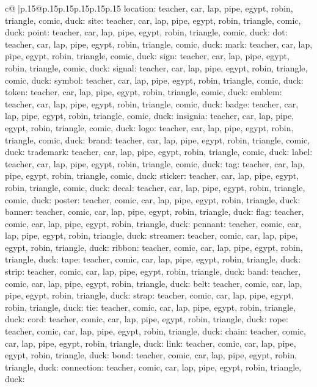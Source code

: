\documentclass{article}
\begin{document}
{\begin{supertabular}{c@{$\;$}|p{.15\linewidth}@{}p{.15\linewidth}p{.15\linewidth}p{.15\linewidth}p{.15\linewidth}p{.15\linewidth}}
{{{location\nTARGETS: teacher, car, lap, pipe, egypt, robin, triangle, comic, duck\n\nCLUE: site\nTARGETS: teacher, car, lap, pipe, egypt, robin, triangle, comic, duck\n\nCLUE: point\nTARGETS: teacher, car, lap, pipe, egypt, robin, triangle, comic, duck\n\nCLUE: dot\nTARGETS: teacher, car, lap, pipe, egypt, robin, triangle, comic, duck\n\nCLUE: mark\nTARGETS: teacher, car, lap, pipe, egypt, robin, triangle, comic, duck\n\nCLUE: sign\nTARGETS: teacher, car, lap, pipe, egypt, robin, triangle, comic, duck\n\nCLUE: signal\nTARGETS: teacher, car, lap, pipe, egypt, robin, triangle, comic, duck\n\nCLUE: symbol\nTARGETS: teacher, car, lap, pipe, egypt, robin, triangle, comic, duck\n\nCLUE: token\nTARGETS: teacher, car, lap, pipe, egypt, robin, triangle, comic, duck\n\nCLUE: emblem\nTARGETS: teacher, car, lap, pipe, egypt, robin, triangle, comic, duck\n\nCLUE: badge\nTARGETS: teacher, car, lap, pipe, egypt, robin, triangle, comic, duck\n\nCLUE: insignia\nTARGETS: teacher, car, lap, pipe, egypt, robin, triangle, comic, duck\n\nCLUE: logo\nTARGETS: teacher, car, lap, pipe, egypt, robin, triangle, comic, duck\n\nCLUE: brand\nTARGETS: teacher, car, lap, pipe, egypt, robin, triangle, comic, duck\n\nCLUE: trademark\nTARGETS: teacher, car, lap, pipe, egypt, robin, triangle, comic, duck\n\nCLUE: label\nTARGETS: teacher, car, lap, pipe, egypt, robin, triangle, comic, duck\n\nCLUE: tag\nTARGETS: teacher, car, lap, pipe, egypt, robin, triangle, comic, duck\n\nCLUE: sticker\nTARGETS: teacher, car, lap, pipe, egypt, robin, triangle, comic, duck\n\nCLUE: decal\nTARGETS: teacher, car, lap, pipe, egypt, robin, triangle, comic, duck\n\nCLUE: poster\nTARGETS: teacher, comic, car, lap, pipe, egypt, robin, triangle, duck\n\nCLUE: banner\nTARGETS: teacher, comic, car, lap, pipe, egypt, robin, triangle, duck\n\nCLUE: flag\nTARGETS: teacher, comic, car, lap, pipe, egypt, robin, triangle, duck\n\nCLUE: pennant\nTARGETS: teacher, comic, car, lap, pipe, egypt, robin, triangle, duck\n\nCLUE: streamer\nTARGETS: teacher, comic, car, lap, pipe, egypt, robin, triangle, duck\n\nCLUE: ribbon\nTARGETS: teacher, comic, car, lap, pipe, egypt, robin, triangle, duck\n\nCLUE: tape\nTARGETS: teacher, comic, car, lap, pipe, egypt, robin, triangle, duck\n\nCLUE: strip\nTARGETS: teacher, comic, car, lap, pipe, egypt, robin, triangle, duck\n\nCLUE: band\nTARGETS: teacher, comic, car, lap, pipe, egypt, robin, triangle, duck\n\nCLUE: belt\nTARGETS: teacher, comic, car, lap, pipe, egypt, robin, triangle, duck\n\nCLUE: strap\nTARGETS: teacher, comic, car, lap, pipe, egypt, robin, triangle, duck\n\nCLUE: tie\nTARGETS: teacher, comic, car, lap, pipe, egypt, robin, triangle, duck\n\nCLUE: cord\nTARGETS: teacher, comic, car, lap, pipe, egypt, robin, triangle, duck\n\nCLUE: rope\nTARGETS: teacher, comic, car, lap, pipe, egypt, robin, triangle, duck\n\nCLUE: chain\nTARGETS: teacher, comic, car, lap, pipe, egypt, robin, triangle, duck\n\nCLUE: link\nTARGETS: teacher, comic, car, lap, pipe, egypt, robin, triangle, duck\n\nCLUE: bond\nTARGETS: teacher, comic, car, lap, pipe, egypt, robin, triangle, duck\n\nCLUE: connection\nTARGETS: teacher, comic, car, lap, pipe, egypt, robin, triangle, duck\n\nCLUE: }}}
\end{supertabular}}
\end{document}
